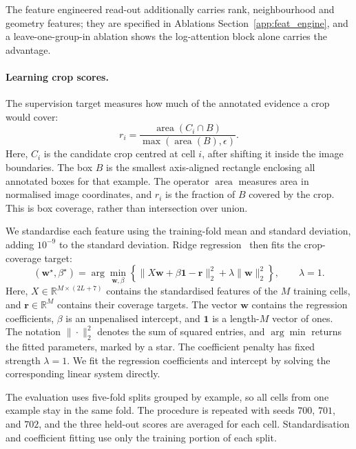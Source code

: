 \documentclass{article} %
\begin{document}
The feature engineered read-out additionally carries rank, neighbourhood and geometry features; they are specified in
Ablations Section~\ref{app:feat_engine}, and a leave-one-group-in ablation shows the log-attention block alone carries the
advantage.

\paragraph{Learning crop scores.}
The supervision target measures how much of the annotated evidence a
crop would cover:
\begin{equation}
    r_i = \frac{\operatorname{area}(C_i\cap B)}
    {\max(\operatorname{area}(B),\epsilon)}.
\end{equation}
Here, \(C_i\) is the candidate crop centred at cell \(i\), after
shifting it inside the image boundaries. The box \(B\) is the smallest
axis-aligned rectangle enclosing all annotated boxes for that example.
The operator \(\operatorname{area}\) measures area in normalised image
coordinates, and \(r_i\) is the fraction of \(B\) covered by the crop.
This is box coverage, rather than intersection over union.

We standardise each feature using the training-fold mean and standard
deviation, adding \(10^{-9}\) to the standard deviation. Ridge
regression~\citep{hoerl1970ridge} then fits the crop-coverage target:
\begin{equation}
    (\mathbf{w}^{\star},\beta^{\star}) =
    \arg\min_{\mathbf{w},\beta}
    \left\{
    \|X\mathbf{w}+\beta\mathbf{1}-\mathbf{r}\|_2^2
    +\lambda\|\mathbf{w}\|_2^2
    \right\}, \qquad \lambda=1.
\end{equation}
Here, \(X\in\mathbb{R}^{M\times(2L+7)}\) contains the standardised
features of the \(M\) training cells, and \(\mathbf{r}\in\mathbb{R}^M\)
contains their coverage targets. The vector \(\mathbf{w}\) contains
the regression coefficients, \(\beta\) is an unpenalised intercept,
and \(\mathbf{1}\) is a length-\(M\) vector of ones. The notation
\(\|\cdot\|_2^2\) denotes the sum of squared entries, and
\(\arg\min\) returns the fitted parameters, marked by a star.
The coefficient penalty has fixed strength \(\lambda=1\).
We fit the regression coefficients and intercept by solving the
corresponding linear system directly.

The evaluation uses five-fold splits grouped by example, so all cells
from one example stay in the same fold. The procedure is repeated with
seeds \(700\), \(701\), and \(702\), and the three held-out scores
are averaged for each cell. Standardisation and coefficient fitting
use only the training portion of each split.
\end{document}
